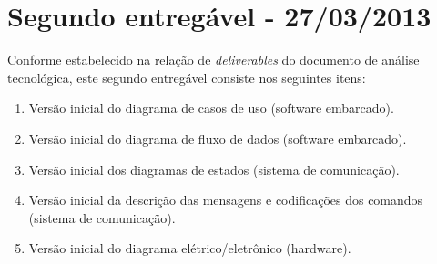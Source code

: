 \chapter{Segundo entregável - 27/03/2013}

Conforme estabelecido na relação de \textit{deliverables} do documento de análise tecnológica, este segundo entregável consiste nos seguintes itens:
\begin{enumerate}[topsep=0pt, partopsep=0pt, itemsep=0pt]
	\item Versão inicial do diagrama de casos de uso (software embarcado).
	\item Versão inicial do diagrama de fluxo de dados (software embarcado).
	\item Versão inicial dos diagramas de estados (sistema de comunicação).
	\item Versão inicial da descrição das mensagens e codificações dos comandos (sistema de comunicação).
	\item Versão inicial do diagrama elétrico/eletrônico (hardware).
\end{enumerate}

